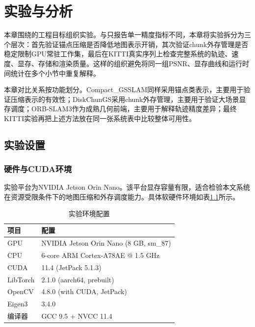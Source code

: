 \chapter{实验与分析}

本章围绕\ScaffoldChunGS 的工程目标组织实验。与只报告单一精度指标不同，本章将实验拆分为三个层次：首先验证锚点压缩是否降低地图表示开销，其次验证chunk外存管理是否稳定限制GPU常驻工作集，最后在KITTI真实序列上检查完整系统的轨迹、速度、显存、存储和渲染质量。这样的组织避免将同一组PSNR、显存曲线和运行时间统计在多个小节中重复解释。

本章对比关系按功能划分。Compact\_GSSLAM同样采用锚点类表示，主要用于验证压缩表示的有效性；DiskChunGS采用chunk外存管理，主要用于验证大场景显存调度；ORB-SLAM3作为成熟几何前端，主要用于解释轨迹精度差异；最终KITTI实验再把上述方法放在同一张系统表中比较整体可用性。

\section{实验设置}

\subsection{硬件与CUDA环境}

实验平台为NVIDIA Jetson Orin Nano。该平台显存容量有限，适合检验本文系统在资源受限条件下的地图压缩和外存调度能力。具体软硬件环境如表\ref{tab:env}所示。

\begin{table}[htbp]
\centering
\caption{实验环境配置}
\label{tab:env}
\begin{tabular}{ll}
\toprule
\textbf{项目} & \textbf{配置} \\
\midrule
GPU & NVIDIA Jetson Orin Nano (8 GB, sm\_87) \\
CPU & 6-core ARM Cortex-A78AE @ 1.5 GHz \\
CUDA & 11.4 (JetPack 5.1.3) \\
LibTorch & 2.1.0 (aarch64, prebuilt) \\
OpenCV & 4.8.0 (with CUDA, JetPack) \\
Eigen3 & 3.4.0 \\
编译器 & GCC 9.5 + NVCC 11.4 \\
\bottomrule
\end{tabular}
\end{table}


